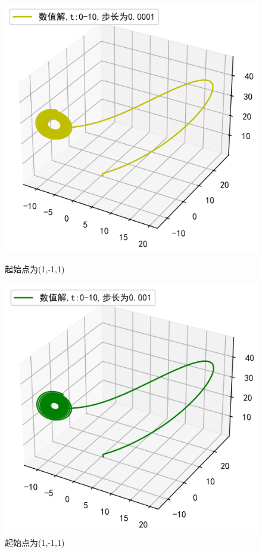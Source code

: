 \documentclass[a4paper]{article}%
\begin{document}
\begin{figure}[h]
    \begin{minipage}{0.48\linewidth}
    \centering
    \includegraphics[scale=0.65]{31}
    \caption{起始点为(1,-1,1)}
    \end{minipage}
    \begin{minipage}{0.48\linewidth}
    \centering
    \includegraphics[scale=0.65]{32}
    \caption{起始点为(1,-1,1)}
    \end{minipage}
\end{figure}
\end{document}
